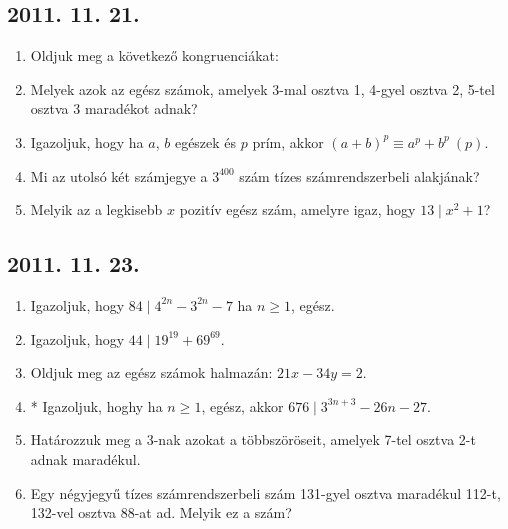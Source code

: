 	
	\subsection*{2011. 11. 21.}
	\begin{enumerate}
		\item Oldjuk meg a következő kongruenciákat:
		\item Melyek azok az egész számok, amelyek 3-mal osztva 1, 4-gyel osztva 2, 5-tel osztva 3 maradékot adnak?
		\item Igazoljuk, hogy ha $a$, $b$ egészek és $p$ prím, akkor $(a+b)^p\equiv a^p+b^p\ (p)$.
		\item Mi az utolsó két számjegye a $3^{400}$ szám tízes számrendszerbeli alakjának?
		\item Melyik az a legkisebb $x$ pozitív egész szám, amelyre igaz, hogy $13\mid  x^2+1$?
	\end{enumerate}
	
	
	\subsection*{2011. 11. 23.}
	\begin{enumerate}
		\item Igazoljuk, hogy $84\mid 4^{2n}-3^{2n}-7$ ha $n\ge1$, egész.
		\item Igazoljuk, hogy $44\mid 19^{19}+69^{69}$.
		\item Oldjuk meg az egész számok halmazán: $21x-34y=2$.
		\item * Igazoljuk, hoghy ha $n\ge1$, egész, akkor $676\mid 3^{3n+3}-26n-27$.
		\item Határozzuk meg a 3-nak azokat a többszöröseit, amelyek 7-tel osztva 2-t adnak maradékul.
		\item Egy négyjegyű tízes számrendszerbeli szám 131-gyel osztva maradékul 112-t, 132-vel osztva 88-at ad. Melyik ez a szám?
	\end{enumerate}
	
	
